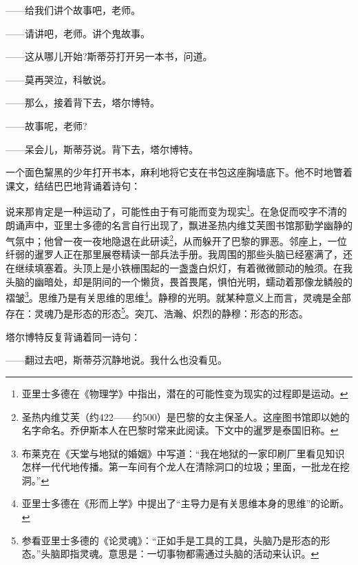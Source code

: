 \par ——给我们讲个故事吧，老师。
\par ——请讲吧，老师。讲个鬼故事。
\par ——这从哪儿开始?斯蒂芬打开另一本书，问道。
\par ——莫再哭泣，科敏说。
\par ——那么，接着背下去，塔尔博特。
\par ——故事呢，老师?
\par ——呆会儿，斯蒂芬说。背下去，塔尔博特。
\par 一个面色黧黑的少年打开书本，麻利地将它支在书包这座胸墙底下。他不时地瞥着课文，结结巴巴地背诵着诗句：
\par 说来那肯定是一种运动了，可能性由于有可能而变为现实\footnote{亚里士多德在《物理学》中指出，潜在的可能性变为现实的过程即是运动。}。在急促而咬字不清的朗诵声中，亚里士多德的名言自行出现了，飘进圣热内维艾芙图书馆那勤学幽静的气氛中；他曾一夜一夜地隐退在此研读\footnote{圣热内维艾芙（约422——约500）是巴黎的女主保圣人。这座图书馆即以她的名字命名。乔伊斯本人在巴黎时常来此阅读。下文中的暹罗是泰国旧称。}，从而躲开了巴黎的罪恶。邻座上，一位纤弱的暹罗人正在那里展卷精读一部兵法手册。我周围的那些头脑已经塞满了，还在继续填塞着。头顶上是小铁栅围起的一盏盏白炽灯，有着微微颤动的触须。在我头脑的幽暗处，却是阴间的一个懒货，畏首畏尾，惧怕光明，蠕动着那像龙鳞般的褶皱\footnote{布莱克在《天堂与地狱的婚姻》中写道：“我在地狱的一家印刷厂里看见知识怎样一代代地传播。第一车间有个龙人在清除洞口的垃圾；里面，一批龙在挖洞。”}。思维乃是有关思维的思维\footnote{亚里士多德在《形而上学》中提出了“主导力是有关思维本身的思维”的论断。}。静穆的光明。就某种意义上而言，灵魂是全部存在：灵魂乃是形态的形态\footnote{参看亚里士多德的《论灵魂》：“正如手是工具的工具，头脑乃是形态的形态。”头脑即指灵魂。意思是：一切事物都需通过头脑的活动来认识。}。突兀、浩瀚、炽烈的静穆：形态的形态。
\par 塔尔博特反复背诵着同一诗句：
\par ——翻过去吧，斯蒂芬沉静地说。我什么也没看见。
